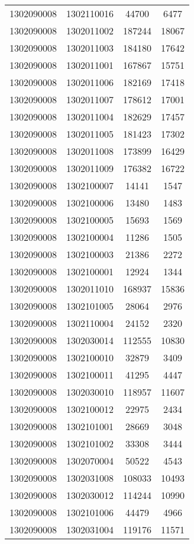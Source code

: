 \begin{longtable}[h]{llcc}
		1302090008 & 1302110016 & 44700 & 6477\\
		1302090008 & 1302011002 & 187244 & 18067\\
		1302090008 & 1302011003 & 184180 & 17642\\
		1302090008 & 1302011001 & 167867 & 15751\\
		1302090008 & 1302011006 & 182169 & 17418\\
		1302090008 & 1302011007 & 178612 & 17001\\
		1302090008 & 1302011004 & 182629 & 17457\\
		1302090008 & 1302011005 & 181423 & 17302\\
		1302090008 & 1302011008 & 173899 & 16429\\
		1302090008 & 1302011009 & 176382 & 16722\\
		1302090008 & 1302100007 & 14141 & 1547\\
		1302090008 & 1302100006 & 13480 & 1483\\
		1302090008 & 1302100005 & 15693 & 1569\\
		1302090008 & 1302100004 & 11286 & 1505\\
		1302090008 & 1302100003 & 21386 & 2272\\
		1302090008 & 1302100001 & 12924 & 1344\\
		1302090008 & 1302011010 & 168937 & 15836\\
		1302090008 & 1302101005 & 28064 & 2976\\
		1302090008 & 1302110004 & 24152 & 2320\\
		1302090008 & 1302030014 & 112555 & 10830\\
		1302090008 & 1302100010 & 32879 & 3409\\
		1302090008 & 1302100011 & 41295 & 4447\\
		1302090008 & 1302030010 & 118957 & 11607\\
		1302090008 & 1302100012 & 22975 & 2434\\
		1302090008 & 1302101001 & 28669 & 3048\\
		1302090008 & 1302101002 & 33308 & 3444\\
		1302090008 & 1302070004 & 50522 & 4543\\
		1302090008 & 1302031008 & 108033 & 10493\\
		1302090008 & 1302030012 & 114244 & 10990\\
		1302090008 & 1302101006 & 44479 & 4966\\
		1302090008 & 1302031004 & 119176 & 11571\\

\end{longtable}
